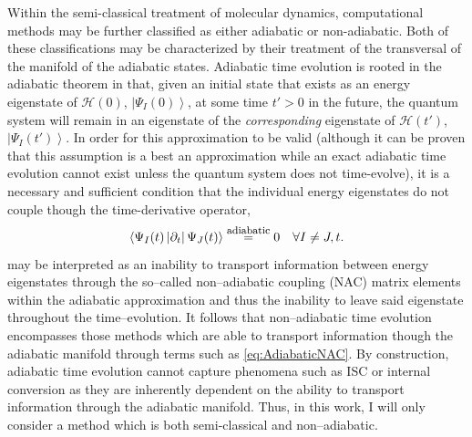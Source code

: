 \documentclass[12pt]{article}
\newcommand{\ket}[1]{\left\vert #1 \right\rangle}         %
\newcommand{\innerop}[3]{\left\langle #1 \left\vert #2 \right\vert #3 \right\rangle}  %
\begin{document}
Within the semi-classical treatment of molecular dynamics, computational methods
may be further classified as either adiabatic or non-adiabatic. Both of these
classifications may be characterized by their treatment of the transversal of
the manifold of the adiabatic states. Adiabatic time evolution is rooted in
the adiabatic theorem in that, given an initial state that exists as an energy
eigenstate of $\mathscr{H}(0)$, $\ket{\Psi_I(0)}$, at some time $t' > 0$ in the
future, the quantum system will remain in an eigenstate of the
\emph{corresponding} eigenstate of $\mathscr{H}(t')$, $\ket{\Psi_I(t')}$. In
order for this approximation to be valid (although it can be proven that this
assumption is a best an approximation while an exact adiabatic time evolution
cannot exist unless the quantum system does not time-evolve), it is a
necessary and sufficient condition that the individual energy eigenstates do
not couple though the time-derivative operator,
\begin{equation}
\innerop{\Psi_I(t)}{\partial_t}{\Psi_J (t)}
  \stackrel{\mathrm{\mbox{\footnotesize adiabatic}}}{=} 0
  \quad \forall I \not = J,t.
  \label{eq:AdiabaticNAC}
\end{equation}
 may be interpreted as an inability to transport
information between energy eigenstates through the so--called non--adiabatic
coupling (NAC) matrix elements within the adiabatic approximation and thus the
inability to leave said eigenstate throughout the time--evolution.  It follows
that non--adiabatic time evolution encompasses those methods which are able to
transport information though the adiabatic manifold through terms such as
\cref{eq:AdiabaticNAC}. By construction, adiabatic time evolution cannot capture
phenomena such as ISC or internal conversion as they are inherently dependent
on the ability to transport information through the adiabatic manifold.  Thus, in
this work, I will only consider a method which is both semi-classical and
non--adiabatic.
\end{document}
